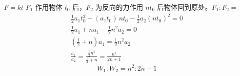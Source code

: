 $F=kt$%
$F_1$ 作用物体 $t_0$ 后，$F_2$ 为反向的力作用 $nt_0$ 后物体回到原处。$F_1:F_2=$
\begin{gather*}
\tfrac12 a_1t_0^2+(a_1t_0)\,nt_0-\tfrac12 a_2(nt_0)^2=0\\
\tfrac12 a_1+na_1-\tfrac12 n^2a_2=0\\
\left(\tfrac12+n\right)a_1=\tfrac12 n^2a_2\\
\frac{a_1}{a_2}=\frac{\frac12 n^2}{\frac12+n}=\frac{n^2}{2n+1}
\end{gather*}
\[ W_1:W_2=n^2:2n+1 \]
